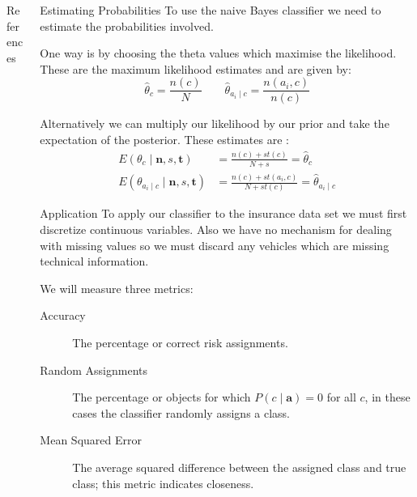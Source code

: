 \documentclass{beamer}
\begin{document}
\begin{frame}
\begin{columns}
\begin{column}{0.30\paperwidth}
		\begin{block}{\small References}
			{\footnotesize
			{}}
			
		\end{block}
		
	\end{column}

	\begin{column}{0.30\paperwidth}

		\begin{block}{Estimating Probabilities}
			To use the naive Bayes classifier we need to estimate the probabilities involved.\vspace{0.5em}

			One way is by choosing the theta values which maximise the likelihood. These are the maximum likelihood estimates and are given by:
			\begin{equation}\label{mles}
				\hat{\theta}_c = \frac{n(c)}{N} \qquad
				\hat{\theta}_{a_i \mid c} = \frac{n(a_i, c)}{n(c)}
			\end{equation}\vspace{0.5em}

			Alternatively we can multiply our likelihood by our prior and take the expectation of the posterior. These estimates are \cite{Zaffalon01}:
			\begin{align}
				E(\theta_c \mid \mathbf{n},s,\mathbf{t}) & = \frac{n(c) + st(c)}{N + s} = \hat{\theta}_c \\
				E(\theta_{a_i \mid c} \mid \mathbf{n},s,\mathbf{t}) & = \frac{n(c) + st(a_i, c)}{N + st(c)} = \hat{\theta}_{a_i \mid c}
			\end{align}
		\end{block}

		\begin{block}{Application}
			To apply our classifier to the insurance data set we must first discretize continuous variables. Also we have no mechanism for dealing with missing values so we must discard any vehicles which are missing technical information.\vspace{0.5em}

			We will measure three metrics:
			\begin{description}
				\item[Accuracy] The percentage or correct risk assignments.
				\item[Random Assignments] The percentage or objects for which $P(c \mid \mathbf{a}) = 0$ for all $c$, in these cases the classifier randomly assigns a class.
				\item[Mean Squared Error] The average squared difference between the assigned class and true class; this metric indicates closeness.
			\end{description}\vspace{0.5em}
		\end{block}


\end{column}
\end{columns}
\end{frame}
\end{document}
